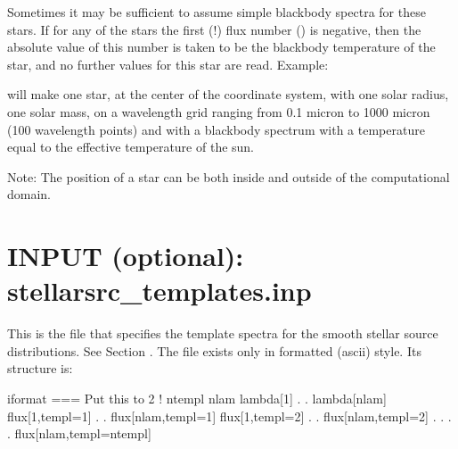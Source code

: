 \documentclass[letterpaper,10pt,english]{sphinxmanual}
\begin{document}
Sometimes it may be sufficient to assume simple blackbody spectra
for these stars. If for any of the stars the first (!) flux number
() is negative, then the absolute value of this number
is taken to be the blackbody temperature of the star, and no further values
for this star are read. Example:

\begin{sphinxVerbatim}[commandchars=\\\{\}]
            
                        
\end{sphinxVerbatim}

will make one star, at the center of the coordinate system, with one solar
radius, one solar mass, on a wavelength grid ranging from 0.1 micron to 1000
micron (100 wavelength points) and with a blackbody spectrum with a
temperature equal to the effective temperature of the sun.

Note: The position of a star can be both inside and outside of the
computational domain.


\section{INPUT (optional): stellarsrc\_templates.inp}
\label{\detokenize{inputoutputfiles:input-optional-stellarsrc-templates-inp}}\label{\detokenize{inputoutputfiles:sec-stellarsrc-templates}}
This is the file that specifies the template spectra for the smooth stellar
source distributions. See Section {\hyperref[\detokenize{stars:sec-distrib-of-stars}]{}}.
The file exists only in formatted (ascii) style. Its structure is:

\begin{sphinxVerbatim}[commandchars=\\\{\}]
iformat                           \PYGZlt{}=== Put this to 2 !
ntempl
nlam
lambda[1]
  .
  .
lambda[nlam]
flux[1,templ=1]
  .
  .
flux[nlam,templ=1]
flux[1,templ=2]
  .
  .
flux[nlam,templ=2]
  .
  .
  .
  .
flux[nlam,templ=ntempl]
\end{sphinxVerbatim}
\end{document}
